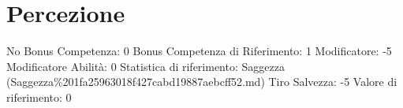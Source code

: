 \section{Percezione}\label{percezione}

\begin{description}
\tightlist
\item[Tags: ABI]
No Bonus Competenza: 0 Bonus Competenza di Riferimento: 1 Modificatore:
-5 Modificatore Abilità: 0 Statistica di riferimento: Saggezza
(Saggezza\%201fa25963018f427cabd19887aebcff52.md) Tiro Salvezza: -5
Valore di riferimento: 0
\end{description}
